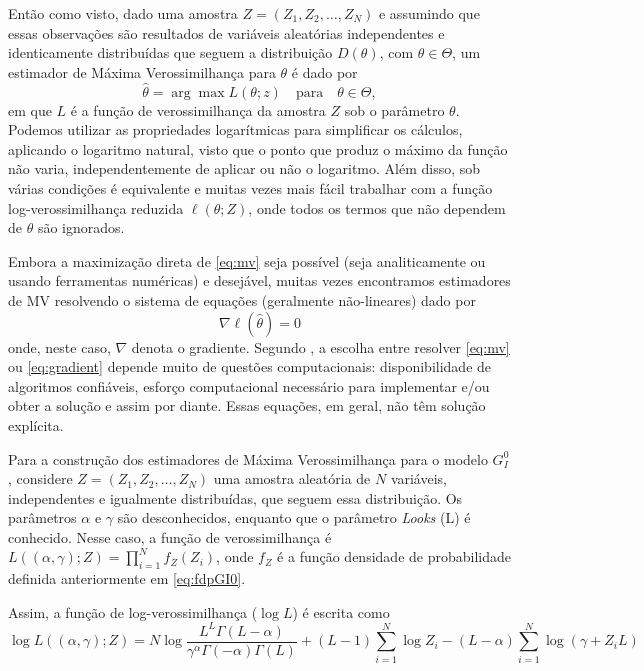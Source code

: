 Então como visto, dado uma amostra $Z = (Z_1, Z_2, \dots, Z_N)$ e assumindo que essas observações são resultados de variáveis aleatórias independentes e identicamente distribuídas que seguem a distribuição $D(\theta)$, com $\theta \in \Theta$, um estimador de Máxima Verossimilhança para $\theta$ é dado por
\begin{equation}
    \widehat{\theta} = \arg\max L(\theta; z) \quad \text{para} \quad \theta \in \Theta, \label{eq:mv}
\end{equation}
em que $L$ é a função de verossimilhança da amostra $Z$ sob o parâmetro $\theta$. Podemos utilizar as propriedades logarítmicas para simplificar os cálculos, aplicando o logaritmo natural, visto que o ponto que produz o máximo da função não varia, independentemente de aplicar ou não o logaritmo. Além disso, sob várias condições é equivalente e muitas vezes mais fácil trabalhar com a função log-verossimilhança reduzida $ \ell (\theta; Z)$, onde todos os termos que não dependem de $\theta$ são ignorados.

Embora a maximização direta de \eqref{eq:mv} seja possível (seja analiticamente ou usando ferramentas numéricas) e desejável, muitas vezes encontramos estimadores de MV resolvendo o sistema de equações (geralmente não-lineares) dado por
\begin{equation}
    \nabla \ell (\widehat{\theta}) = 0 \label{eq:gradient} 
\end{equation}
onde, neste caso, $\nabla$ denota o gradiente. Segundo \citet{FreryMinute2004}, a escolha entre resolver \eqref{eq:mv} ou \eqref{eq:gradient} depende muito de questões computacionais: disponibilidade de algoritmos confiáveis, esforço computacional necessário para implementar e/ou obter a solução e assim por diante. Essas equações, em geral, não têm solução explícita.

Para a construção dos estimadores de Máxima Verossimilhança para o modelo $G_I^0$, considere $Z = (Z_1, Z_2, \dots, Z_N)$ uma amostra aleatória de $N$ variáveis, independentes e igualmente distribuídas, que seguem essa distribuição. Os parâmetros $\alpha$ e $\gamma$ são desconhecidos, enquanto que o parâmetro \textit{Looks} (L) é conhecido. Nesse caso, a função de verossimilhança é $L((\alpha, \gamma); Z) = \prod_{i=1}^{N} f_Z(Z_i)$, onde $f_Z$ é a função densidade de probabilidade definida anteriormente em \eqref{eq:fdpGI0}. 

Assim, a função de log-verossimilhança ($\log L$) é escrita como
\begin{equation}
    \log L((\alpha, \gamma); Z) = N\log \frac{L^{L}\Gamma(L-\alpha)}{\gamma^{\alpha}\Gamma(-\alpha)\Gamma(L)} +  (L-1)\sum_{i=1}^{N}\log Z_i - (L-\alpha)\sum_{i=1}^{N}\log (\gamma + Z_iL) \label{eq:logVer}
\end{equation}

